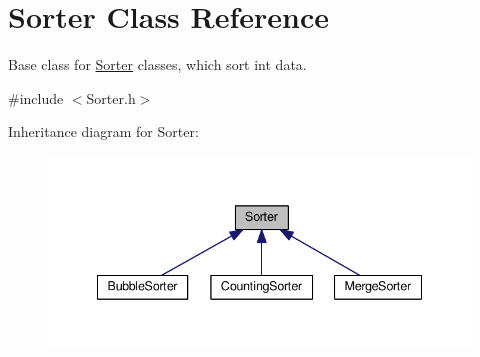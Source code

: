 \hypertarget{class_sorter}{}\section{Sorter Class Reference}
\label{class_sorter}


Base class for \hyperlink{class_sorter}{Sorter} classes, which sort int data.  




{\ttfamily \#include $<$Sorter.\+h$>$}



Inheritance diagram for Sorter\+:
\nopagebreak
\begin{figure}[H]
\begin{center}
\leavevmode
\includegraphics[width=342pt]{class_sorter__inherit__graph}
\end{center}
\end{figure}
